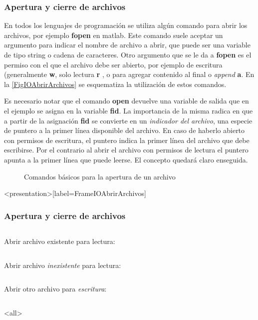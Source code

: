 \subsubsection{Apertura y cierre de archivos}
En todos los lenguajes de programación se utiliza algún comando
para abrir los archivos, por ejemplo \textbf{fopen} en matlab.
Este comando suele aceptar un argumento para indicar el
nombre de archivo a abrir, que puede ser una variable 
de tipo string o cadena de caracteres. Otro argumento
que se le da a \textbf{fopen} es el permiso con el 
que el archivo debe ser abierto, por ejemplo
de escritura (generalmente \textbf{w}, solo lectura \textbf{r}
, o para agregar contenido al final o \emph{append} \textbf{a}. 
En la  \autoref{FigIOAbrirArchivos} se esquematiza
la utilización de estos comandos. 

Es necesario notar que el comando \textbf{open} devuelve
una variable de salida que en el ejemplo se asigna 
en la variable \textbf{fid}. 
La importancia de la misma radica en que a partir
de la asignación \textbf{fid} se convierte en 
un \emph{indicador del archivo}, una especie de puntero
a la primer línea disponible del archivo. En caso
de haberlo abierto con permisos de escritura, 
el puntero indica la primer línea del 
archivo que debe escribirse. Por el contrario
al abrir el archivo con permisos de lectura
el puntero apunta a la primer
línea que puede leerse. El concepto quedará 
claro enseguida. 

\begin{figure}
\caption{Comandos básicos para la apertura de un archivo\label{FigIOAbrirArchivos}}
\end{figure}

\mode*

\begin{frame}<presentation>[label=FrameIOAbrirArchivos]
\frametitle{Apertura y cierre de archivos}

\begin{columns}[T]
\hfill Abrir archivo existente para lectura:
\begin{codeblock}

\end{codeblock}
\end{columns}

\begin{columns}[T]
\hfill Abrir archivo \emph{inexistente} para lectura:
\begin{codeblock}

\end{codeblock}
\end{columns}

\begin{columns}[T]
\hfill Abrir otro archivo  para \emph{escritura}:
\begin{codeblock}

\end{codeblock}
\end{columns}

\end{frame}

\mode<all>
